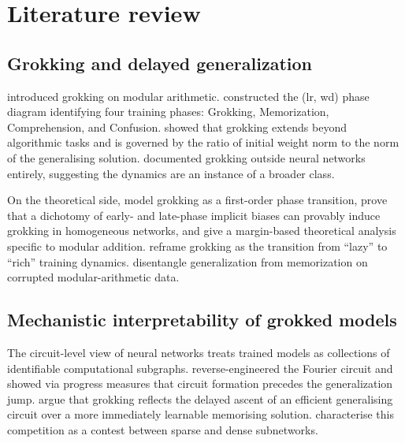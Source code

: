 \documentclass[12pt,openany,a4paper]{book}
\begin{document}
\chapter{Literature review}
\label{ch:litreview}

\section{Grokking and delayed generalization}

\citet{power2022grokking} introduced grokking on modular arithmetic. \citet{liu2022towards} constructed the (lr, wd) phase diagram identifying four training phases: Grokking, Memorization, Comprehension, and Confusion. \citet{liu2023omnigrok} showed that grokking extends beyond algorithmic tasks and is governed by the ratio of initial weight norm to the norm of the generalising solution. \citet{miller2024grokking} documented grokking outside neural networks entirely, suggesting the dynamics are an instance of a broader class.

On the theoretical side, \citet{rubin2024grokking} model grokking as a first-order phase transition, \citet{lyu2024dichotomy} prove that a dichotomy of early- and late-phase implicit biases can provably induce grokking in homogeneous networks, and \citet{mohamadi2024grok} give a margin-based theoretical analysis specific to modular addition. \citet{kumar2024lazy} reframe grokking as the transition from ``lazy'' to ``rich'' training dynamics. \citet{doshi2024grok} disentangle generalization from memorization on corrupted modular-arithmetic data.

\section{Mechanistic interpretability of grokked models}

The circuit-level view of neural networks \citep{olah2020zoom,elhage2021mathematical} treats trained models as collections of identifiable computational subgraphs. \citet{nanda2023progress} reverse-engineered the Fourier circuit and showed via progress measures that circuit formation precedes the generalization jump. \citet{varma2023explaining} argue that grokking reflects the delayed ascent of an efficient generalising circuit over a more immediately learnable memorising solution. \citet{merrill2023tale} characterise this competition as a contest between sparse and dense subnetworks.
\end{document}
